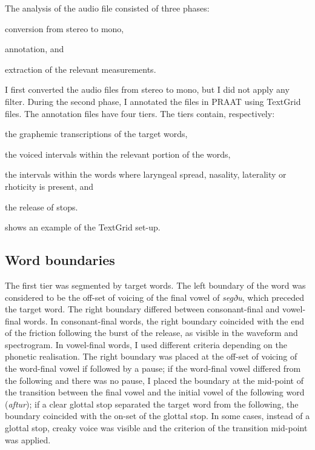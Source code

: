 \documentclass[11pt,a4paper,openany]{memoir}\usepackage[]{graphicx}\usepackage[]{color}
\begin{document}
The analysis of the audio file consisted of three phases:
\begin{inparaenum}[(1)]
	\item conversion from stereo to mono,
	\item annotation, and
	\item extraction of the relevant measurements.
\end{inparaenum}
I first converted the audio files from stereo to mono, but I did not apply any filter.
During the second phase, I annotated the files in PRAAT \citep{boersma2015} using TextGrid files.
The annotation files have four tiers.
The tiers contain, respectively: 
\begin{inparaenum}[(1)]
	\item the graphemic transcriptions of the target words,
	\item the voiced intervals within the relevant portion of the words, 
	\item the intervals within the words where laryngeal spread, nasality, laterality or rhoticity is present, and
	\item the release of stops.
\end{inparaenum}
 shows an example of the TextGrid set-up.

\subsection{Word boundaries}

The first tier was segmented by target words.
The left boundary of the word was considered to be the off-set of voicing of the final vowel of \textit{segðu}, which preceded the target word.
The right boundary differed between consonant-final and vowel-final words.
In consonant-final words, the right boundary coincided with the end of the friction following the burst of the release, as visible in the waveform and spectrogram.
In vowel-final words, I used different criteria depending on the phonetic realisation.
The right boundary was placed at the off-set of voicing of the word-final vowel if followed by a pause; if the word-final vowel differed from the following and there was no pause, I placed the boundary at the mid-point of the transition between the final vowel and the initial vowel of the following word (\textit{aftur}); if a clear glottal stop separated the target word from the following, the boundary coincided with the on-set of the glottal stop.
In some cases, instead of a glottal stop, creaky voice was visible and the criterion of the transition mid-point was applied.
\end{document}

